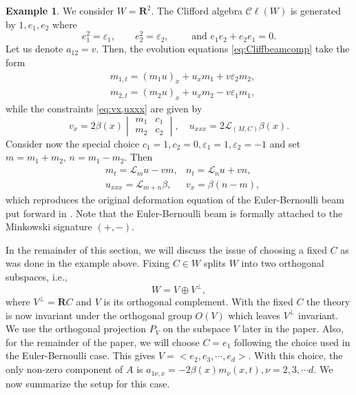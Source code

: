 \documentclass[10pt,a4paper]{article}
\numberwithin{equation}{section}
\theoremstyle{plain}
\theoremstyle{definition}
\newtheorem{example}[example]{Example}
\newcommand{\R}{\mathbf{R}}
\renewcommand{\epsilon}{\varepsilon}
\newcommand\Cl{\mathcal{C}\ell}
\begin{document}
\begin{example}
We consider $W=\R^2$.  The Clifford algebra $\Cl(W)$ is generated by $1, e_1, e_2$ where 
\begin{equation} 
e_1^2=\epsilon_1,\qquad e_2^2=\epsilon_2, \qquad \text{ and } e_1e_2+e_2e_1=0.  
\end{equation}
Let us denote $a_{12}=v$.  Then, the evolution equations \eqref{eq:Cliffbeamcomp} take the form
\begin{align}
&m_{1,t}=(m_1u)_x+u_xm_1+v\epsilon_2 m_2, \\
&m_{2,t}=(m_2u)_x+u_xm_2-v\epsilon_1 m_1,  
\end{align}
while the constraints \eqref{eq:vx,uxxx} are given by
\begin{equation} 
v_x=2\beta(x)\begin{vmatrix} m_1&c_1\\m_2&c_2 \end{vmatrix}, \quad u_{xxx}=2\mathcal{L}_{(M,C)}\beta(x).  
\end{equation} 
Consider now the special choice $c_1=1, c_2=0, \epsilon_1=1, \epsilon_2=-1$ and set $m=m_1+m_2, \, n=m_1-m_2$.  
Then 
\begin{align}
&m_t=\mathcal{L}_m u -v m, &n_t=\mathcal{L}_n u+vn, \\
&u_{xxx}=\mathcal{L}_{m+n} \beta, &v_x=\beta(n-m),   
\end{align}
which reproduces the original deformation equation of the Euler-Bernoulli beam put forward in \cite{beals-szmigielski:2021p:2CH-euler-bernoulli-beam-noncommutative-continued-fractions}.  Note that the Euler-Bernoulli beam is formally attached to the Minkowski signature $(+, -)$.  
\end{example} 
In the remainder of this section, we will discuss the issue of choosing a fixed $C$ as was done in the example 
above.  Fixing $C \in W$ splits $W$ into two orthogonal subspaces, i.e., 
\begin{equation}
W=V\oplus V^\perp, 
\end{equation} 
where $V^\perp=\R C$ and $V$ is its orthogonal complement.  
With the fixed $C$ the theory is now invariant under the orthogonal group $O(V)$ which leaves $V^\perp$ 
invariant.  We use the orthogonal projection $P_V$ on the subspace $V$ later in the paper.  
Also, for the remainder of the paper, we will choose $C=e_1$ following the choice used in the Euler-Bernoulli case.  This gives $V=<e_2,e_3, \cdots, e_d>$.  With this choice, the only non-zero component of $A$ is 
$a_{1\nu, x}=-2\beta(x) m_\nu(x,t), \nu=2,3, \cdots d$.  We now summarize the setup for this case.  
\end{document}
